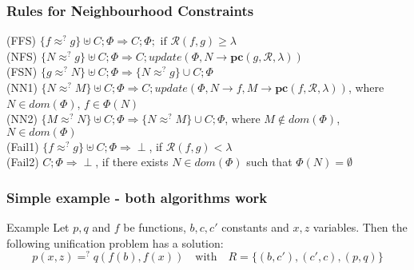 		
		\begin{frame}[fragile=singleslide]
	\frametitle{Rules for Neighbourhood Constraints}
		\textcolor[rgb]{0.55,0,0}{(FFS)} $\{f \approx^? g\} \uplus C; \Phi \Rightarrow  C; \Phi; \text{ if } \mathcal{R}(f,g)\geq \lambda$ \\
		\vspace{0.3cm}
		\textcolor[rgb]{0.55,0,0}{(NFS)} $\{N \approx^? g\} \uplus C; \Phi \Rightarrow  C; update(\Phi,N\rightarrow \textbf{pc}(g,\mathcal{R},\lambda))$  \\
		\vspace{0.3cm}
		\textcolor[rgb]{0.55,0,0}{(FSN)} $\{g \approx^? N\} \uplus C; \Phi \Rightarrow  \{N \approx^? g\} \cup C;\Phi$  \\
		\vspace{0.3cm}
		\textcolor[rgb]{0.55,0,0}{(NN1)} $\{N \approx^? M\} \uplus C; \Phi \Rightarrow  C; update(\Phi,N\rightarrow {f}, M\rightarrow \textbf{pc}(f,\mathcal{R},\lambda))$, where $N \in dom(\Phi )$, $f\in \Phi(N)$ \\
		\vspace{0.3cm}
		\textcolor[rgb]{0.55,0,0}{(NN2)} $\{M \approx^? N\} \uplus C; \Phi \Rightarrow  \{N \approx^? M\} \cup C;\Phi$, where $M \notin dom(\Phi )$, $N\in dom(\Phi)$ \\
		\vspace{0.3cm}
		\textcolor[rgb]{0.55,0,0}{(Fail1)} $\{f \approx^? g\} \uplus C; \Phi \Rightarrow  \perp$, if $\mathcal{R}(f,g) < \lambda$ \\
		\vspace{0.3cm}
		\textcolor[rgb]{0.55,0,0}{(Fail2)} $C; \Phi \Rightarrow  \perp$, if there exists $N \in dom(\Phi )$ such that $\Phi (N)=\emptyset$ \\
		\vspace{0.3cm}
	
  \end{frame}	


	\begin{frame}[fragile=singleslide]
	\frametitle{Simple example - both algorithms work}
	\begin{exampleblock}{Example}
	Let $p,q$ and $f$ be functions, $b,c,c'$ constants and $x,z$ variables. Then the following unification problem has a solution:\\
	\[p(x,z) =^? q(f(b),f(x)) \quad \text{with}\quad R=\{(b,c'),(c',c),(p,q)\}\]\\
	\end{exampleblock}
	\end{frame}
	
